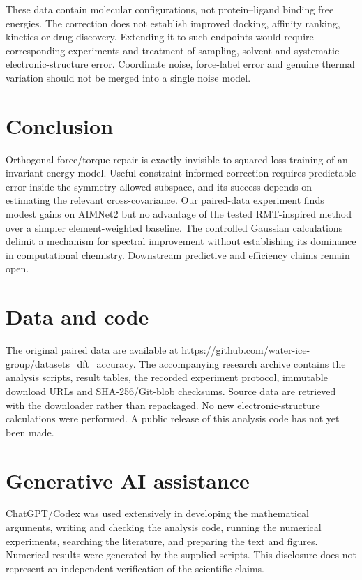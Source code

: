 \documentclass[11pt]{article}
\begin{document}
These data contain molecular configurations, not protein--ligand binding free
energies. The correction does not establish improved docking, affinity ranking,
kinetics or drug discovery. Extending it to such endpoints would require
corresponding experiments and treatment of sampling, solvent and systematic
electronic-structure error. Coordinate noise, force-label error and genuine
thermal variation should not be merged into a single noise model.

\section{Conclusion}
Orthogonal force/torque repair is exactly invisible to squared-loss training of an
invariant energy model. Useful constraint-informed correction requires predictable
error inside the symmetry-allowed subspace, and its success depends on estimating
the relevant cross-covariance. Our paired-data experiment finds modest gains on
AIMNet2 but no advantage of the tested RMT-inspired method over a simpler
element-weighted baseline. The controlled Gaussian calculations delimit a mechanism
for spectral improvement without establishing its dominance in computational
chemistry. Downstream predictive and efficiency claims remain open.

\section*{Data and code}
The original paired data are available at
\url{https://github.com/water-ice-group/datasets_dft_accuracy}.
The accompanying research archive contains the analysis scripts, result tables,
the recorded experiment protocol, immutable download URLs and SHA-256/Git-blob
checksums. Source data are retrieved with the downloader rather than repackaged.
No new electronic-structure calculations were performed. A public release of
this analysis code has not yet been made.

\section*{Generative AI assistance}
ChatGPT/Codex was used extensively in developing the mathematical arguments,
writing and checking the analysis code, running the numerical experiments,
searching the literature, and preparing the text and figures. Numerical results
were generated by the supplied scripts. This disclosure does not represent an
independent verification of the scientific claims.
\end{document}
